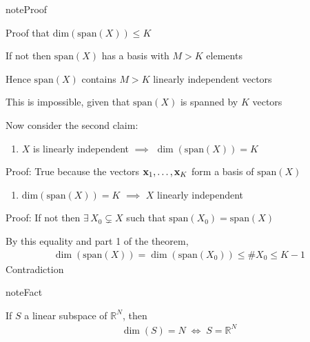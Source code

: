 \documentclass[letterpaper,10pt,english]{jupyterBook}
\begin{document}
\begin{sphinxadmonition}{note}{Proof}

\sphinxAtStartPar
Proof that \(\mathrm{dim}(\mathrm{span}(X)) \leq K\)

\sphinxAtStartPar
If not then \(\mathrm{span}(X)\) has a basis with \(M > K\) elements

\sphinxAtStartPar
Hence \(\mathrm{span}(X)\) contains \(M > K\) linearly independent vectors

\sphinxAtStartPar
This is impossible, given that \(\mathrm{span}(X)\) is spanned by \(K\) vectors

\sphinxAtStartPar
Now consider the second claim:
\begin{enumerate}
%
\item {} 
\sphinxAtStartPar
\(X\) is linearly independent \(\implies\) \(\dim(\mathrm{span}(X)) = K\)

\end{enumerate}

\sphinxAtStartPar
Proof: True because the vectors \({\bf x}_1,\ldots,{\bf x}_K\) form
a basis of \(\mathrm{span}(X)\)
\begin{enumerate}
%
\setcounter{enumi}{1}
\item {} 
\sphinxAtStartPar
\(\mathrm{dim}(\mathrm{span}(X)) = K\) \(\implies\) \(X\) linearly independent

\end{enumerate}

\sphinxAtStartPar
Proof: If not then \(\exists \, X_0 \subsetneq X\) such that \(\mathrm{span}(X_0) = \mathrm{span}(X)\)

\sphinxAtStartPar
By this equality and part 1 of the theorem,
\begin{equation*}
\begin{split}\dim(\mathrm{span}(X)) = \dim(\mathrm{span}(X_0)) \leq \# X_0 \leq K - 1\end{split}
\end{equation*}
\sphinxAtStartPar
Contradiction
\end{sphinxadmonition}

\begin{sphinxadmonition}{note}{Fact}

\sphinxAtStartPar
If \(S\) a linear subspace of \(\mathbb{R}^N\), then
\begin{equation*}
\begin{split}
%
\dim(S) = N \; \iff \; S = \mathbb{R}^N
%
\end{split}
\end{equation*}\end{sphinxadmonition}
\end{document}
